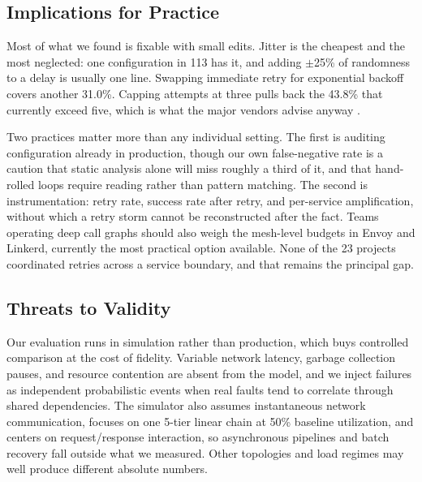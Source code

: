 \documentclass[conference]{IEEEtran}
\begin{document}
\subsection{Implications for Practice}

Most of what we found is fixable with small edits. Jitter is the cheapest and the most neglected: one configuration in 113 has it, and adding $\pm$25\% of randomness to a delay is usually one line. Swapping immediate retry for exponential backoff covers another 31.0\%. Capping attempts at three pulls back the 43.8\% that currently exceed five, which is what the major vendors advise anyway \cite{aws_backoff, google_retry}.

Two practices matter more than any individual setting. The first is auditing configuration already in production, though our own false-negative rate is a caution that static analysis alone will miss roughly a third of it, and that hand-rolled loops require reading rather than pattern matching. The second is instrumentation: retry rate, success rate after retry, and per-service amplification, without which a retry storm cannot be reconstructed after the fact. Teams operating deep call graphs should also weigh the mesh-level budgets in Envoy and Linkerd, currently the most practical option available. None of the 23 projects coordinated retries across a service boundary, and that remains the principal gap.

\subsection{Threats to Validity}

Our evaluation runs in simulation rather than production, which buys controlled comparison at the cost of fidelity. Variable network latency, garbage collection pauses, and resource contention are absent from the model, and we inject failures as independent probabilistic events when real faults tend to correlate through shared dependencies. The simulator also assumes instantaneous network communication, focuses on one 5-tier linear chain at 50\% baseline utilization, and centers on request/response interaction, so asynchronous pipelines and batch recovery fall outside what we measured. Other topologies and load regimes may well produce different absolute numbers.
\end{document}

